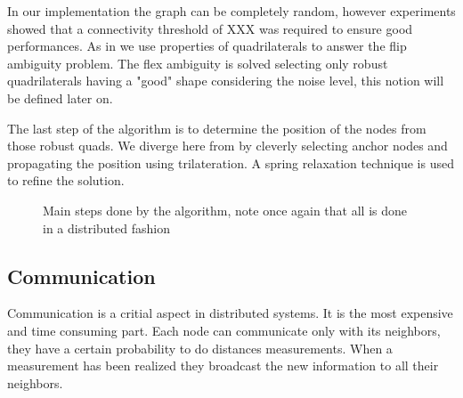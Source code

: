 \documentclass[letterpaper, 10 pt, conference]{ieeeconf}  %
\begin{document}
In our implementation the graph can be completely random, however experiments showed that a connectivity threshold of XXX was required to ensure good performances. As in \cite{MooreTeller} we use properties of quadrilaterals to answer the flip ambiguity problem. The flex ambiguity is solved selecting only robust quadrilaterals having a "good" shape considering the noise level, this notion will be defined later on. 

The last step of the algorithm is to determine the position of the nodes from those robust quads. We diverge here from \cite{MooreTeller} by cleverly selecting anchor nodes and propagating the position using trilateration. A spring relaxation technique is used to refine the solution. 

   \begin{figure}[thpb]
      \centering
      \caption{Main steps done by the algorithm, note once again that all is done in a distributed fashion}
      \label{figurelabel}
   \end{figure}




%

\subsection{Communication}
Communication is a critial aspect in distributed systems. It is the most expensive and time consuming part. Each node can communicate only with its neighbors, they have a certain probability to do distances measurements. When a measurement has been realized they broadcast the new information to all their neighbors.
\end{document}

